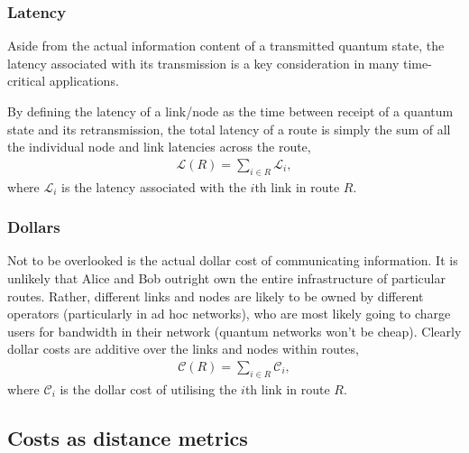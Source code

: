 
%
%

\subsubsection{Latency} \label{sec:latency_metric} 

Aside from the actual information content of a transmitted quantum state, the latency associated with its transmission is a key consideration in many time-critical applications.

By defining the latency of a link/node as the time between receipt of a quantum state and its retransmission, the total latency of a route is simply the sum of all the individual node and link latencies across the route,
\begin{align}
\mathcal{L}(R) = \sum_{i\in R} \mathcal{L}_i,
\end{align}
where $\mathcal{L}_i$ is the latency associated with the $i$th link in route $R$.

%
%

\subsubsection{Dollars} \label{sec:dollars} 

Not to be overlooked is the actual dollar cost of communicating information. It is unlikely that Alice and Bob outright own the entire infrastructure of particular routes. Rather, different links and nodes are likely to be owned by different operators (particularly in ad hoc networks), who are most likely going to charge users for bandwidth in their network (quantum networks won't be cheap). Clearly dollar costs are additive over the links and nodes within routes,
\begin{align}
\mathcal{C}(R) = \sum_{i\in R} \mathcal{C}_i,
\end{align}
where $\mathcal{C}_i$ is the dollar cost of utilising the $i$th link in route $R$.

%
%

\subsection{Costs as distance metrics} \label{sec:cost_as_dist} 

